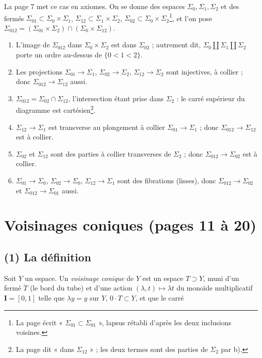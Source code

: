 \documentclass[11pt,a4paper]{article}
\begin{document}
La page 7 met ce cas en axiomes. On se donne des espaces $\Sigma_0, \Sigma_1,
\Sigma_2$ et des fermés $\Sigma_{01} \subset \Sigma_0 \times \Sigma_1$, $\Sigma_{12}
\subset \Sigma_1 \times \Sigma_2$, $\Sigma_{02} \subset \Sigma_0 \times
\Sigma_2$\footnote{La page écrit « $\Sigma_{01} \subset \Sigma_{01}$ », lapsus
rétabli d'après les deux inclusions voisines.}, et l'on pose
$\Sigma_{012} = (\Sigma_{01} \times \Sigma_2) \cap (\Sigma_0 \times \Sigma_{12})$.
\begin{enumerate}
\item[a)] L'image de $\Sigma_{012}$ dans $\Sigma_0 \times \Sigma_2$ est dans
$\Sigma_{02}$ ; autrement dit, $\Sigma_0 \amalg \Sigma_1 \amalg \Sigma_2$ porte un
ordre au-dessus de $\{0 < 1 < 2\}$.
\item[b)] Les projections $\Sigma_{01} \to \Sigma_1$, $\Sigma_{02} \to \Sigma_2$,
$\Sigma_{12} \to \Sigma_2$ sont injectives, à collier ; donc $\Sigma_{012} \to
\Sigma_{12}$ aussi.
\item[c)] $\Sigma_{012} = \Sigma_{02} \cap \Sigma_{12}$, l'intersection étant prise
dans $\Sigma_2$ : le carré supérieur du diagramme est cartésien\footnote{La page
dit « dans $\Sigma_{12}$ » ; les deux termes sont des parties de $\Sigma_2$ par
b).}.
\item[d)] $\Sigma_{12} \to \Sigma_1$ est transverse au plongement à collier
$\Sigma_{01} \to \Sigma_1$ ; donc $\Sigma_{012} \to \Sigma_{12}$ est à collier.
\item[e)] $\Sigma_{02}$ et $\Sigma_{12}$ sont des parties à collier transverses de
$\Sigma_2$ ; donc $\Sigma_{012} \to \Sigma_{02}$ est à collier.
\item[f)] $\Sigma_{01} \to \Sigma_0$, $\Sigma_{02} \to \Sigma_0$, $\Sigma_{12} \to
\Sigma_1$ sont des fibrations (lisses), donc $\Sigma_{012} \to \Sigma_{02}$ et
$\Sigma_{012} \to \Sigma_{01}$ aussi.
\end{enumerate}

\section*{Voisinages coniques (pages 11 à 20)}

\subsection*{(1) La définition}

Soit $Y$ un espace. Un \emph{voisinage conique} de $Y$ est un espace $T \supset Y$,
muni d'un fermé $\dot T$ (le bord du tube) et d'une action $(\lambda, t) \mapsto
\lambda t$ du monoïde multiplicatif $\mathbf{I} = [0,1]$ telle que $\lambda y = y$
sur $Y$, $0 \cdot T \subset Y$, et que le carré
\end{document}

